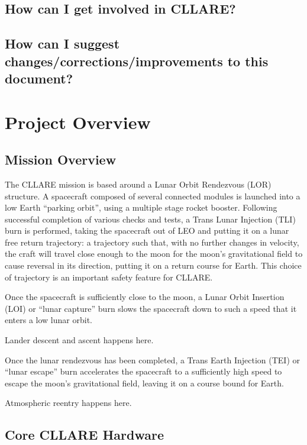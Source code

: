 \documentclass{report}
\begin{document}
\section{How can I get involved in CLLARE?}

\section{How can I suggest changes/corrections/improvements to this document?}


\chapter{Project Overview}

\section{Mission Overview}

The CLLARE mission is based around a Lunar Orbit Rendezvous (LOR) structure.  A spacecraft composed of several connected modules is launched into a low Earth ``parking orbit'', using a multiple stage rocket booster.  Following successful completion of various checks and tests, a Trans Lunar Injection (TLI) burn is performed, taking the spacecraft out of LEO and putting it on a lunar free return trajectory: a trajectory such that, with no further changes in velocity, the craft will travel close enough to the moon for the moon's gravitational field to cause reversal in its direction, putting it on a return course for Earth.  This choice of trajectory is an important safety feature for CLLARE.

Once the spacecraft is sufficiently close to the moon, a Lunar Orbit Insertion (LOI) or ``lunar capture'' burn slows the spacecraft down to such a speed that it enters a low lunar orbit.

Lander descent and ascent happens here.

Once the lunar rendezvous has been completed, a Trans Earth Injection (TEI) or ``lunar escape'' burn accelerates the spacecraft to a sufficiently high speed to escape the moon's gravitational field, leaving it on a course bound for Earth.

Atmospheric reentry happens here.

\section{Core CLLARE Hardware}
\end{document}
